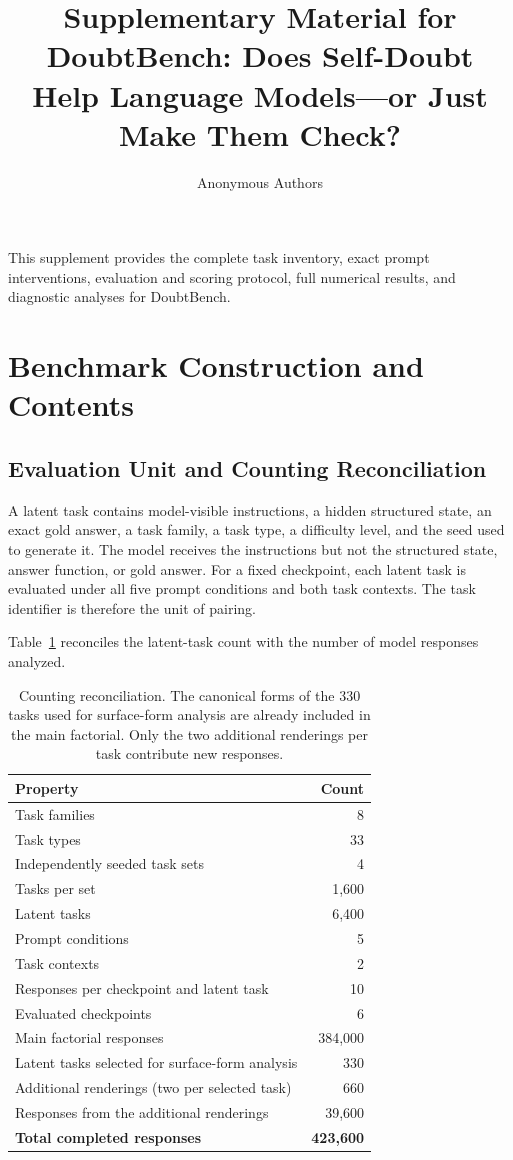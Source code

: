 \documentclass[sigconf,anonymous,review]{acmart}
\title{Supplementary Material for DoubtBench: Does Self-Doubt Help Language Models---or Just Make Them Check?}
\author{Anonymous Authors}
\date{}
\begin{document}
\maketitle

This supplement provides the complete task inventory, exact prompt
interventions, evaluation and scoring protocol, full numerical results, and
diagnostic analyses for DoubtBench.

\tableofcontents

\section{Benchmark Construction and Contents}

\subsection{Evaluation Unit and Counting Reconciliation}

A latent task contains model-visible instructions, a hidden structured state,
an exact gold answer, a task family, a task type, a difficulty level, and the
seed used to generate it. The model receives the instructions but not the
structured state, answer function, or gold answer. For a fixed checkpoint,
each latent task is evaluated under all five prompt conditions and both task
contexts. The task identifier is therefore the unit of pairing.

Table~\ref{tab:counts} reconciles the latent-task count with the number of
model responses analyzed.

\begin{table}[H]
\centering
\small
\begin{tabular}{@{}lr@{}}
\toprule
Property & Count \\
\midrule
Task families & 8 \\
Task types & 33 \\
Independently seeded task sets & 4 \\
Tasks per set & 1,600 \\
Latent tasks & 6,400 \\
Prompt conditions & 5 \\
Task contexts & 2 \\
Responses per checkpoint and latent task & 10 \\
Evaluated checkpoints & 6 \\
Main factorial responses & 384,000 \\
Latent tasks selected for surface-form analysis & 330 \\
Additional renderings (two per selected task) & 660 \\
Responses from the additional renderings & 39,600 \\
\textbf{Total completed responses} & \textbf{423,600} \\
\bottomrule
\end{tabular}
\caption{Counting reconciliation. The canonical forms of the 330 tasks used
for surface-form analysis are already included in the main factorial. Only
the two additional renderings per task contribute new responses.}
\label{tab:counts}
\end{table}
\end{document}
